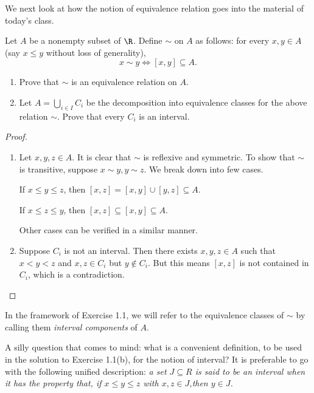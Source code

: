 \documentclass[pmath450]{subfiles}
\begin{document}
    \np
    We next look at how the notion of equivalence relation goes into the material of today's class.

    \begin{exercise}{}
        Let $A$ be a nonempty subset of $\R$. Define $\sim$ on $A$ as follows: for every $x,y\in A$ (say $x\leq y$ without loss of generality),
        \begin{equation}
            x\sim y\iff \left[ x,y \right]\subseteq A.
        \end{equation}
        \begin{enumerate}
            \item Prove that $\sim$ is an equivalence relation on $A$.
            \item Let $A=\bigcup^{}_{i\in I}C_i$ be the decomposition into equivalence classes for the above relation $\sim$. Prove that every $C_i$ is an interval.
        \end{enumerate}
    \end{exercise}

    \begin{proof}
        \begin{enumerate}
            \item Let $x,y,z\in A$. It is clear that $\sim$ is reflexive and symmetric. To show that $\sim$ is transitive, suppose $x\sim y, y\sim z$. We break down into few cases.

                If $x\leq y\leq z$, then $\left[ x,z \right]=\left[ x,y \right]\cup\left[ y,z \right]\subseteq A$.

                If $x\leq z\leq y$, then $\left[ x,z \right]\subseteq\left[ x,y \right]\subseteq A$.

                Other cases can be verified in a similar manner.

            \item Suppose $C_i$ is not an interval. Then there exists $x,y,z\in A$ such that $x<y<z$ and $x,z\in C_i$ but $y\notin C_i$. But this means $\left[ x,z \right]$ is not contained in $C_i$, which is a contradiction.
        \end{enumerate}
    \end{proof}

    \clearpage
    \np In the framework of Exercise 1.1, we will refer to the equivalence classes of $\sim$ by calling them \textit{interval components} of $A$.

    \np A silly question that comes to mind: what is a convenient definition, to be used in the solution to Exercise 1.1(b), for the notion of interval? It is preferable to go with the following unified description:
    \textit{a set $J\subseteq R$ is said to be an interval when it has the property that, if $x\leq y\leq z$ with $x,z\in J$,then $y\in J$.}
\end{document}
